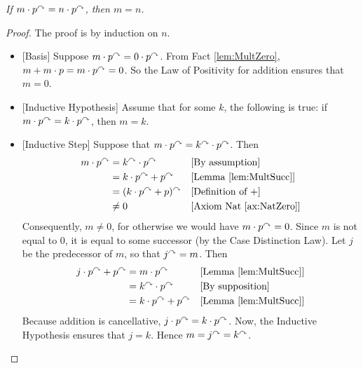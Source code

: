 \begin{fact}

  \emph{If $m\cdot p^\curvearrowright = n\cdot p^\curvearrowright$, then $m=n$.}

\begin{proof}
  The proof is by induction on $n$.
  \begin{itemize}
  \item{}[Basis] Suppose $m\cdot p^\curvearrowright = 0\cdot p^\curvearrowright$. From Fact
    \ref{lem:MultZero}, $m+ m\cdot p = m\cdot p^\curvearrowright = 0$. So the Law of
    Positivity for addition ensures that $m=0$.
  \item{}[Inductive Hypothesis] Assume that for some $k$, the following is true:
    if $m\cdot p^\curvearrowright = k\cdot p^\curvearrowright$, then $m=k$.
  \item{}[Inductive Step] Suppose that $m\cdot p^\curvearrowright = k^\curvearrowright \cdot
    p^\curvearrowright$. Then
    \begin{align*}
      m\cdot p^\curvearrowright &= k^\curvearrowright\cdot p^\curvearrowright &&\text{[By assumption]}\\
      &= k\cdot p^\curvearrowright + p^\curvearrowright &&\text{[Lemma \ref{lem:MultSucc}]}\\
      &= (k\cdot p^\curvearrowright + p)^\curvearrowright &&\text{[Definition of $+$]}\\
      &\neq 0 &&\text{[Axiom Nat \ref{ax:NatZero}]}
    \end{align*}
    Consequently, $m\neq 0$, for otherwise we would have $m\cdot
    p^\curvearrowright = 0$. Since $m$ is not equal to $0$, it is equal to some
    successor (by the Case Distinction Law). Let $j$ be the predecessor of $m$,
	so that $j^\curvearrowright=m$. Then
    \begin{align*}
      j\cdot p^\curvearrowright + p^\curvearrowright & = m\cdot p^\curvearrowright &&\text{[Lemma \ref{lem:MultSucc}]}\\
      &= k^\curvearrowright \cdot p^\curvearrowright &&\text{[By supposition]}\\
      &= k\cdot p^\curvearrowright + p^\curvearrowright &&\text{[Lemma \ref{lem:MultSucc}]}
    \end{align*}
    Because addition is cancellative, $j\cdot p^\curvearrowright = k\cdot
    p^\curvearrowright$. Now, the Inductive Hypothesis ensures that $j=k$. Hence
    $m = j^\curvearrowright = k^\curvearrowright$.
  \end{itemize}
\end{proof}
\end{fact}

